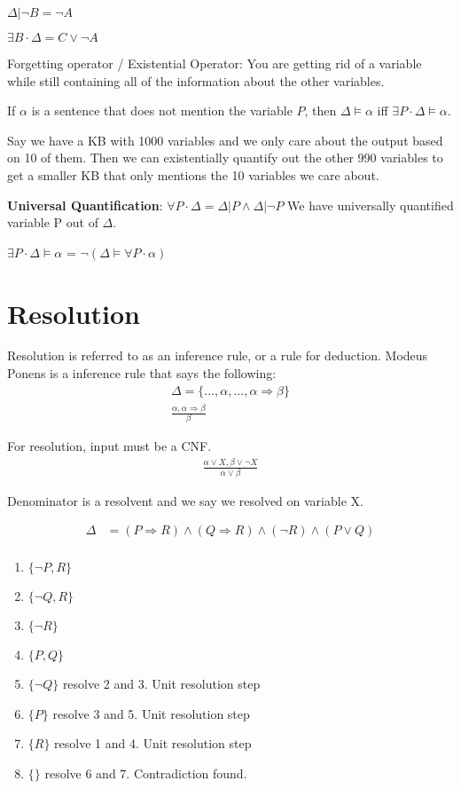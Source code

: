 \documentclass[11pt]{article}
\begin{document}
$\Delta | \neg B = \neg A$

$\exists B \cdot \Delta = C \lor \neg A$
\vspace{1em}

Forgetting operator / Existential Operator: You are getting rid of a variable while still containing all of the information about the other variables.

If $\alpha$ is a sentence that does not mention the variable $P$, then $\Delta \models \alpha$ iff $\exists P \cdot \Delta \models \alpha$.

Say we have a KB with 1000 variables and we only care about the output based on 10 of them. Then we can existentially quantify out the other 990 variables to get a smaller KB that only mentions the 10 variables we care about.
\vspace{1em}

\textbf{Universal Quantification}: $\forall P \cdot \Delta = \Delta | P \land \Delta | \neg P$ We have universally quantified variable P out of $\Delta$.

$\exists P \cdot \Delta \models \alpha$ = $\neg(\Delta \models \forall P \cdot \alpha)$ 

\section{Resolution}
Resolution is referred to as an inference rule, or a rule for deduction. Modeus Ponens is a inference rule that says the following:
\begin{align}
\Delta= \{...,\alpha,...,\alpha \Rightarrow \beta\}\\
\frac{\alpha, \alpha \Rightarrow \beta}{\beta}
\end{align}

For resolution, input must be a CNF.
\begin{align*}
\frac{\alpha \lor X, \beta \lor \neg X}{\alpha \lor \beta}
\end{align*}

Denominator is a resolvent and we say we resolved on variable X.

\begin{align*}
\Delta &= (P \Rightarrow R) \land (Q \Rightarrow R) \land (\neg R) \land (P \lor Q)\\
\end{align*}
\begin{enumerate}
    \item $\{\neg P, R\}$
    \item $\{\neg Q, R\}$
    \item $\{\neg R\}$
    \item $\{P, Q\}$
    \item $\{\neg Q\}$ resolve 2 and 3. Unit resolution step
    \item $\{P\}$ resolve 3 and 5. Unit resolution step
    \item $\{R\}$ resolve 1 and 4. Unit resolution step
    \item $\{\}$ resolve 6 and 7. Contradiction found.
\end{enumerate}
\end{document}
